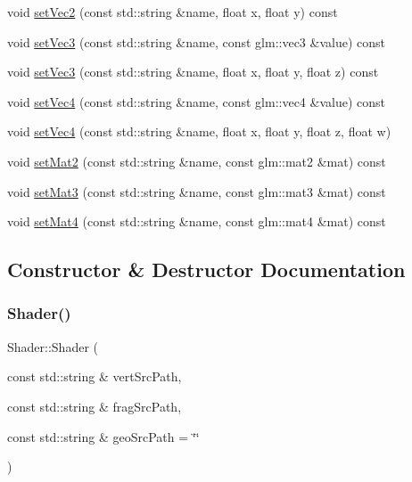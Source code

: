 \begin{DoxyCompactItemize}
void \hyperlink{classShader_afb91bc9e954bf590857c96ab1331b0ec}{set\+Vec2} (const std\+::string \&name, float x, float y) const
\item 
void \hyperlink{classShader_aeb021061c5d451329d92257b07dbfec3}{set\+Vec3} (const std\+::string \&name, const glm\+::vec3 \&value) const
\item 
void \hyperlink{classShader_a90092c25b7dc23964c465b93887300f9}{set\+Vec3} (const std\+::string \&name, float x, float y, float z) const
\item 
void \hyperlink{classShader_a79cbe674f6bf1a576a48045dcb924de5}{set\+Vec4} (const std\+::string \&name, const glm\+::vec4 \&value) const
\item 
void \hyperlink{classShader_a913e10fe2501b00746ae6901b97a1730}{set\+Vec4} (const std\+::string \&name, float x, float y, float z, float w)
\item 
void \hyperlink{classShader_a91a6ee79b959cacd618c9e29a5bbd732}{set\+Mat2} (const std\+::string \&name, const glm\+::mat2 \&mat) const
\item 
void \hyperlink{classShader_a3e24fcad187493dfebaa12939072e91d}{set\+Mat3} (const std\+::string \&name, const glm\+::mat3 \&mat) const
\item 
void \hyperlink{classShader_a8e711c96f3e1722cbfb88fde9478977c}{set\+Mat4} (const std\+::string \&name, const glm\+::mat4 \&mat) const
\end{DoxyCompactItemize}


\subsection{Constructor \& Destructor Documentation}
\mbox{\label{classShader_a7e347bafb56502a85791603d3e52ba3c}} 
\subsubsection{\texorpdfstring{Shader()}{Shader()}\hspace{0.1cm}{\footnotesize\ttfamily [1/2]}}
{\footnotesize\ttfamily Shader\+::\+Shader (\begin{DoxyParamCaption}\item[{const std\+::string \&}]{vert\+Src\+Path,  }\item[{const std\+::string \&}]{frag\+Src\+Path,  }\item[{const std\+::string \&}]{geo\+Src\+Path = {\ttfamily \char`\"{}\char`\"{}} }\end{DoxyParamCaption})}



